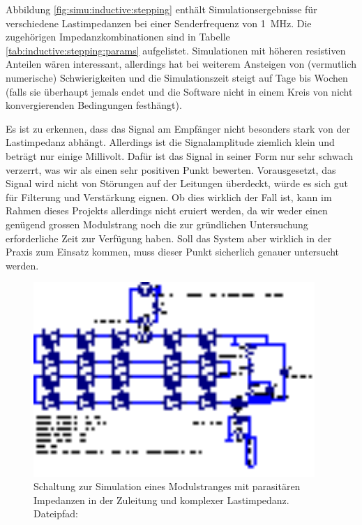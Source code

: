 Abbildung  \ref{fig:simu:inductive:stepping}  enth\"alt  Simulationsergebnisse
f\"ur    verschiedene   Lastimpedanzen    bei    einer   Senderfrequenz    von
\SI{1}{\mega\hertz}.   Die zugeh\"origen Impedanzkombinationen sind in Tabelle
\ref{tab:inductive:stepping:params}  aufgelistet. Simulationen  mit  h\"oheren
resistiven  Anteilen w\"aren  interessant, allerdings  hat   bei
weiterem  Ansteigen von   (vermutlich  numerische) Schwierigkeiten
und  die Simulationszeit  steigt auf  Tage bis  Wochen (falls  sie \"uberhaupt
jemals endet und  die Software nicht in einem Kreis  von nicht konvergierenden
Bedingungen festh\"angt).

Es  ist zu  erkennen, dass  das Signal  am Empf\"anger  nicht besonders  stark
von der  Lastimpedanz abh\"angt. Allerdings  ist die  Signalamplitude ziemlich
klein und  betr\"agt nur  einige Millivolt. Daf\"ur ist  das Signal  in seiner
Form  nur sehr  schwach  verzerrt,  was wir  als  einen  sehr positiven  Punkt
bewerten. Vorausgesetzt,  das  Signal  wird  nicht  von  St\"orungen  auf  der
Leitungen \"uberdeckt, w\"urde  es sich gut f\"ur  Filterung und Verst\"arkung
eignen. Ob  dies  wirklich  der  Fall  ist, kann  im  Rahmen  dieses  Projekts
allerdings  nicht  eruiert  werden,  da wir  weder  einen  gen\"ugend  grossen
Modulstrang  noch die  zur gr\"undlichen  Untersuchung erforderliche  Zeit zur
Verf\"ugung haben. Soll  das System  aber wirklich in  der Praxis  zum Einsatz
kommen, muss dieser Punkt sicherlich genauer untersucht werden.

\begin{figure}[h!tb]
    \centering
    \includegraphics[width=0.95\textwidth]{images/ltspice/jac/inductive.eps}
    \caption[Induktive Einkopplung, -Schaltung f\"ur Modulstrang]{%
        Schaltung  zur   Simulation  eines  Modulstranges   mit  parasit\"aren
        Impedanzen in der Zuleitung und komplexer Lastimpedanz.\protect\\
        Dateipfad: %
    }
    \label{fig:ltspice:inductive:complete}
\end{figure}

